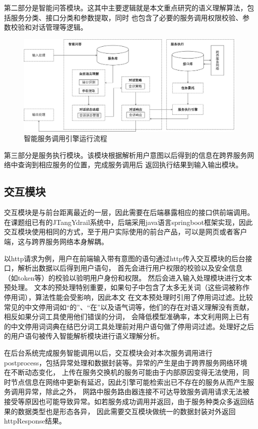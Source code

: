 第二部分是智能问答模块。这其中主要逻辑就是本文重点研究的语义理解算法，包括服务分类、接口分类和参数提取，同时
也包含了必要的服务调用权限校验、参数校验和对话管理等逻辑。

\begin{figure}[htbp]
  \centering
  \includegraphics[width=15cm]{./images/yinqinliucheng.png}
  \caption{智能服务调用引擎运行流程}
  \label{fig:yinqinliucheng}
\end{figure}

第三部分是服务执行模块。该模块根据解析用户意图以后得到的信息在跨界服务网络中查询到相应服务的位置，完成服务调用后
返回执行结果到输入输出模块。

\subsection{交互模块}
交互模块是与前台距离最近的一层，因此需要在后端暴露相应的接口供前端调用。在课题组已有的JTangYdrail系统中，后端采用java语言springboot框架实现，因此
交互模块使用相同的方式，至于用户实际使用的前台产品，可以是网页或者客户端，这与跨界服务网络本身解耦。

以http请求为例，用户在前端输入带有意图的语句通过http传入交互模块的后台接口，解析出数据以后得到用户语句，
首先会进行用户权限的校验以及安全信息（如token等）的校验以验明用户身份和权限。
然后会进入输入处理模块进行文本预处理。
文本的预处理特别重要，如果句子中包含了太多无关词（这些词被称作停用词），算法性能会受影响，因此本文
在文本预处理时引用了停用词过滤。比较常见的中文停用词如“的”、“在”以及语气词等，他们的存在对语义理解没有贡献，相反如果分词工具使用他们错误的分词，
会降低模型准确率，本文利用网上已有的中文停用词词典在结巴分词工具处理前对用户语句做了停用词过滤。处理好之后的用户语句被传入智能解析模块进行语义理解分析。

在后台系统完成服务智能调用以后，交互模块会对本次服务调用进行postprocess，包括异常处理和数据封装等。异常的产生是由于跨界服务网络环境在不断动态变化，
上传在服务交换机的服务可能由于内部原因变得无法使用，同时节点信息在网络中更新有延迟，因此引擎可能检索出已不存在的服务从而产生服务调用异常，除此之外，
网路中服务路由器连接不可达导致服务调用请求无法被接受等原因也可能导致异常。如若服务成功调用并返回，由于服务种类众多返回结果的数据类型也是形态各异，
因此需要交互模块做统一的数据封装对外返回httpResponse结果。

